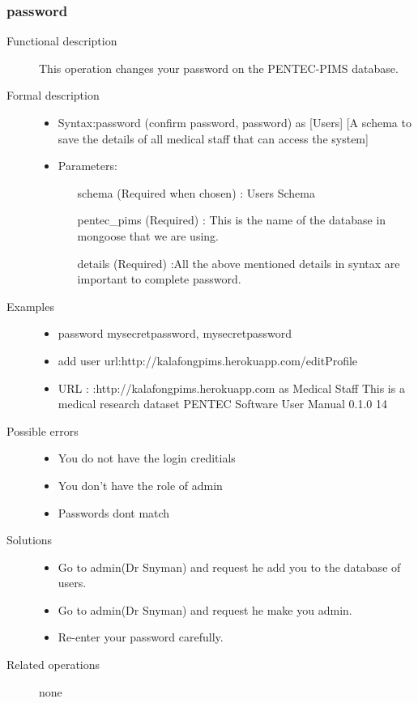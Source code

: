 \documentclass[a4paper]{article}
\begin{document}
\subsubsection{password}
\begin{description}
\item[Functional description] This operation changes your password on the PENTEC-PIMS database.
\item[Formal description]\hfill
\begin{itemize}
	\item Syntax:password (confirm password, password) as [Users] [A schema to save the details of all medical staff that can access the system]\\
	\item Parameters:
	\begin{itemize}
		\item [schema] (Required when chosen) : Users Schema
		\item [pentec\_pims] (Required) : This is the name of the database in mongoose that we are using.
		\item [details] (Required) :All the above mentioned details in syntax are important to complete password.
	\end{itemize}
\end{itemize}

\item[Examples]\hfill
\begin{itemize}
	\item password mysecretpassword, mysecretpassword
	\item add user url:http://kalafongpims.herokuapp.com/editProfile
	\item URL : :http://kalafongpims.herokuapp.com as Medical Staff This is a medical research dataset
	PENTEC Software User Manual 0.1.0 14
\end{itemize}
\item[Possible errors]\hfill
\begin{itemize}
	\item You do not have the login creditials
	\item You don't have the role of admin
	\item Passwords dont match
\end{itemize}
\item[Solutions]\hfill
\begin{itemize}
	\item Go to admin(Dr Snyman) and request he add you to the database of users.
	\item  Go to admin(Dr Snyman) and request he make you admin.
	\item Re-enter your password carefully.
\end{itemize}
\item[Related operations] none
\end{description}
\end{document}
